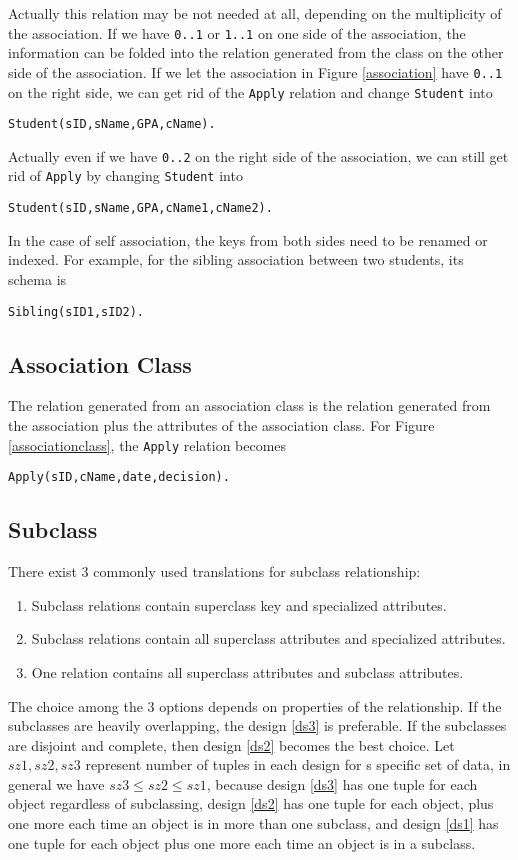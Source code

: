 Actually this relation may be not needed at all, depending on the multiplicity of the association. If we have \texttt{0..1} or \texttt{1..1} on one side of the association, the information can be folded into the relation generated from the class on the other side of the association. If we let the association in Figure \ref{association} have \texttt{0..1} on the right side, we can get rid of the \texttt{Apply} relation and change \texttt{Student} into
\begin{lstlisting}
Student(sID,sName,GPA,cName).
\end{lstlisting}
Actually even if we have \texttt{0..2} on the right side of the association, we can still get rid of \texttt{Apply} by changing \texttt{Student} into
\begin{lstlisting}
Student(sID,sName,GPA,cName1,cName2).
\end{lstlisting}
In the case of self association, the keys from both sides need to be renamed or indexed. For example, for the sibling association between two students, its schema is 
\begin{lstlisting}
Sibling(sID1,sID2).
\end{lstlisting}
\subsection{Association Class}
The relation generated from an association class is the relation generated from the association plus the attributes of the association class. For Figure \ref{associationclass}, the \texttt{Apply} relation becomes
\begin{lstlisting}
Apply(sID,cName,date,decision).
\end{lstlisting}
\subsection{Subclass}
There exist 3 commonly used translations for subclass relationship:
\begin{enumerate}
\item \label{ds1}Subclass relations contain superclass key and specialized attributes.
\item \label{ds2}Subclass relations contain all superclass attributes and specialized attributes.
\item \label{ds3}One relation contains all superclass attributes and subclass attributes. 
\end{enumerate}
The choice among the 3 options depends on properties of the relationship. If the subclasses are heavily overlapping, the design \ref{ds3} is preferable. If the subclasses are disjoint and complete, then design \ref{ds2} becomes the best choice. Let $sz1, sz2, sz3$ represent number of tuples in each design for s specific set of data, in general we have $sz3\leq sz2\leq sz1$, because design \ref{ds3} has one tuple for each object regardless of subclassing, design \ref{ds2} has one tuple for each object, plus one more each time an object is in more than one subclass, and design \ref{ds1} has one tuple for each object plus one more each time an object is in a subclass.

